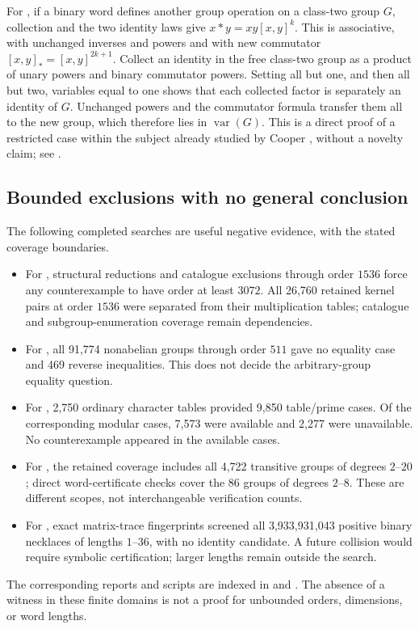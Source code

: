 \label{partial:6.47}
For , if a binary word defines another group operation
on a class-two group \(G\), collection and the two identity laws
give \(x*y=xy[x,y]^k\). This is associative, with unchanged
inverses and powers and with new commutator
\([x,y]_*=[x,y]^{2k+1}\).
Collect an identity in the free class-two group as a product
of unary powers and binary commutator powers. Setting all but
one, and then all but two, variables equal to one shows that
each collected factor is separately an identity of \(G\).
Unchanged powers and the commutator formula transfer them all
to the new group, which therefore lies in \(\operatorname{var}(G)\).
This is a direct proof of a restricted case within the subject
already studied by Cooper \cite{cooper}, without a novelty claim;
see .

\iffullpaper
\subsection{Bounded exclusions with no general conclusion}

The following completed searches are useful negative evidence,
with the stated coverage boundaries.

\begin{itemize}
\item For , structural reductions and catalogue
exclusions through order \(1536\) force any counterexample
to have order at least \(3072\). All 26,760 retained kernel
pairs at order \(1536\) were separated from their multiplication
tables; catalogue and subgroup-enumeration coverage remain
dependencies.
\item For , all 91,774 nonabelian groups through
order \(511\) gave no equality case and 469 reverse inequalities.
This does not decide the arbitrary-group equality question.
\item For , 2,750 ordinary character tables provided
9,850 table/prime cases. Of the corresponding modular cases,
7,573 were available and 2,277 were unavailable. No
counterexample appeared in the available cases.
\item For , the retained coverage includes all
4,722 transitive groups of degrees \(2\)--\(20\); direct
word-certificate checks cover the 86 groups of degrees
\(2\)--\(8\). These are different scopes, not interchangeable
verification counts.
\item For , exact matrix-trace fingerprints screened
all 3,933,931,043 positive binary necklaces of lengths
\(1\)--\(36\), with no identity candidate.
A future collision would require symbolic certification;
larger lengths remain outside the search.
\end{itemize}

The corresponding reports and scripts are indexed in
 and .
The absence of a witness in these finite domains is not a
proof for unbounded orders, dimensions, or word lengths.
\fi
